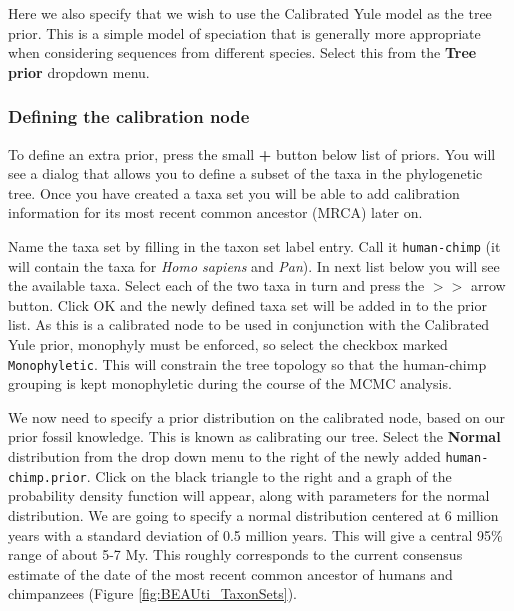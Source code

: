 \documentclass[11pt]{article}
\theoremstyle{plain}%
\theoremstyle{definition}
\theoremstyle{remark}
\begin{document}
Here we also specify that we wish to use the Calibrated Yule model \cite{Heled:2012fk}
as the tree prior. This is a simple model of speciation that
is generally more appropriate when considering sequences from different species. %
Select this from the {\bf Tree prior} dropdown menu.


\subsubsection{Defining the calibration node}

To define an extra prior, press the small {\bf +} button below list of priors. You will see a
dialog that allows you to define a subset of the taxa in the phylogenetic tree. Once you have created a taxa set you will be able to add calibration information for its most recent common
ancestor (MRCA) later on. 

Name the taxa set by filling in the taxon set label entry. 
Call it \texttt{human-chimp} (it will contain the taxa for {\it Homo sapiens} and {\it Pan}).
In next list below you will see the available taxa. Select each of the two taxa in turn and press the $> >$ arrow button. 
Click OK and the newly defined taxa set will be added in to the prior list.
As this is a calibrated node to be used in conjunction with the Calibrated Yule prior, monophyly must be enforced, so select the checkbox marked \texttt{Monophyletic}. This will constrain the tree topology so that the human-chimp grouping is kept monophyletic during the course of the MCMC analysis.

We now need to specify a prior distribution on the calibrated node, based on our prior fossil knowledge. This is known
as calibrating our tree. Select the \textbf{Normal} distribution from the drop down menu to the right of the newly added \texttt{human-chimp.prior}. Click on the black triangle to the right and
a graph of the probability density function will appear, along with parameters for the normal distribution.
We are going to specify a normal distribution centered at 6 million
years with a standard deviation of 0.5 million years. This will give
a central 95\% range of about 5-7 My. This roughly corresponds to the current consensus
estimate of the date of the most recent common ancestor of humans and chimpanzees (Figure \ref{fig:BEAUti_TaxonSets}).
\end{document}
